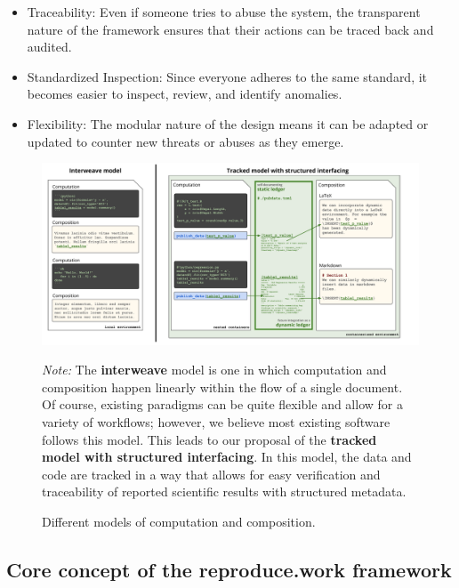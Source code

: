 \begin{itemize}
\itemsep -0.2em
\item Traceability: Even if someone tries to abuse the system, the transparent nature of the framework ensures that their actions can be traced back and audited.
\item Standardized Inspection: Since everyone adheres to the same standard, it becomes easier to inspect, review, and identify anomalies.
\item Flexibility: The modular nature of the design means it can be adapted or updated to counter new threats or abuses as they emerge.
\end{itemize}

\begin{figure}[h]
\centering
\caption{Different models of computation and composition.}
\label{fig:comp}
\includegraphics[width=\textwidth]{../../nbs/img/comp.pdf}

\vspace{2mm}
\begin{minipage}{0.95\textwidth}
{}
\footnotesize{
\emph{Note:} The \textbf{interweave} model is one in which computation and composition happen linearly within the flow of a single document. Of course, existing paradigms can be quite flexible and allow for a variety of workflows; however, we believe most existing software follows this model. This leads to our proposal of the \textbf{tracked model with structured interfacing}. In this model, the data and code are tracked in a way that allows for easy verification and traceability of reported scientific results with structured metadata.
}
\end{minipage}
\end{figure}

\hypertarget{core-concept-of-the-reproduce.work-framework}{%
\subsection{Core concept of the reproduce.work framework}\label{core-concept-of-the-reproduce.work-framework}}

